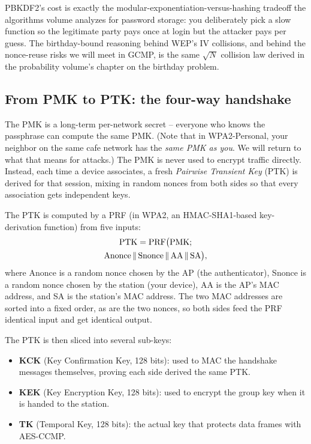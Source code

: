 \begin{connectionbox}
PBKDF2's cost is exactly the modular-exponentiation-versus-hashing tradeoff the
algorithms volume analyzes for password storage: you deliberately pick a slow
function so the legitimate party pays once at login but the attacker pays per
guess. The birthday-bound reasoning behind WEP's IV collisions, and behind the
nonce-reuse risks we will meet in GCMP, is the same $\sqrt{N}$ collision law
derived in the probability volume's chapter on the birthday problem.
\end{connectionbox}

\subsection{From PMK to PTK: the four-way handshake}

The PMK is a long-term per-network secret -- everyone who knows the passphrase can
compute the same PMK. (Note that in WPA2-Personal, your neighbor on the same
cafe network has the \emph{same PMK as you}. We will return to what that means for
attacks.) The PMK is never used to encrypt traffic directly. Instead, each time a
device associates, a fresh \emph{Pairwise Transient Key} (PTK) is derived for that
session, mixing in random nonces from both sides so that every association gets
independent keys.

The PTK is computed by a PRF (in WPA2, an HMAC-SHA1-based key-derivation
function) from five inputs:
\begin{multline*}
  \text{PTK} = \operatorname{PRF}\bigl(\text{PMK};\\
  \text{Anonce} \,\|\, \text{Snonce} \,\|\, \text{AA} \,\|\, \text{SA}\bigr),
\end{multline*}
where Anonce is a random nonce chosen by the AP (the authenticator), Snonce is a
random nonce chosen by the station (your device), AA is the AP's MAC address, and
SA is the station's MAC address. The two MAC addresses are sorted into a fixed
order, as are the two nonces, so both sides feed the PRF identical input and get
identical output.

The PTK is then sliced into several sub-keys:
\begin{itemize}
  \item \textbf{KCK} (Key Confirmation Key, 128 bits): used to MAC the handshake
        messages themselves, proving each side derived the same PTK.
  \item \textbf{KEK} (Key Encryption Key, 128 bits): used to encrypt the group
        key when it is handed to the station.
  \item \textbf{TK} (Temporal Key, 128 bits): the actual key that protects data
        frames with AES-CCMP.
\end{itemize}

